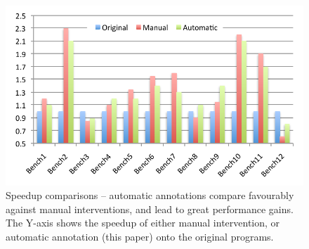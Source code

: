 \documentclass[sigplan,10pt,review,anonymous]{acmart}
\begin{document}








\begin{figure}[t!]
\begin{center}
\includegraphics[width=0.9\columnwidth]{images/Absolute_speedups}
\caption{Speedup comparisons -- automatic annotations compare favourably against
manual interventions, and lead to great performance gains.
The Y-axis shows the speedup of either manual intervention, or automatic
annotation (this paper) onto the original programs.}
\label{fig:Absolute_speedups}
\end{center}
\end{figure}
\end{document}
